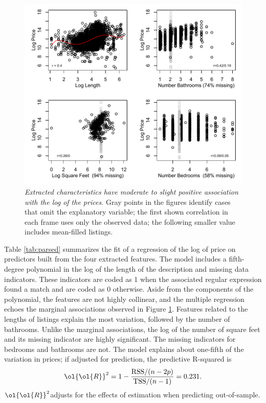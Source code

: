 \documentclass[12pt]{article}
\newcommand{\prs}{\mbox{$\ol{\ol{R}}^2$}}
\begin{document}
 \begin{figure}
  \caption{ \label{fig:parsed} { \sl Extracted characteristics have moderate to
 slight positive association with the log of the prices. } Gray points in the
 figures identify cases that omit the explanatory variable; the first shown
 correlation in each frame uses only the observed data; the following smaller 
 value includes mean-filled listings. }
 
\centerline{
 \vspace{0.1in}
 \includegraphics[width=5in]{figures/parsed} }
 \vspace{0.2in}
 \end{figure}


 Table \ref{tab:parsed} summarizes the fit of a regression of the log of price
 on predictors built from the four extracted features. The model includes a
 fifth-degree polynomial in the log of the length of the description and missing
 data indicators.  These indicators are coded as 1 when the associated regular
 expression found a match and are coded as 0 otherwise.  Aside from the
 components of the polynomial, the features are not highly collinear, and the
 multiple regression echoes the marginal associations observed in Figure
 \ref{fig:parsed}.  Features related to the lengths of listings explain the most
 variation, followed by the number of bathrooms.  Unlike the marginal
 associations, the log of the number of square feet and its missing indicator
 are highly significant.  The missing indicators for bedrooms and bathrooms are
 not.  The model explains about one-fifth of the variation in prices;  
 if adjusted for prediction, the predictive R-squared \citep{fosterstine14b} is
 \begin{equation}
   \prs = 1 - \frac{\mbox{RSS}/(n-2p)}{\mbox{TSS}/(n-1)} = 0.231.
 \end{equation}
 \prs adjusts for the effects of estimation when predicting out-of-sample.
\end{document}
